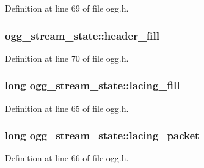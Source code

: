 Definition at line 69 of file ogg.\+h.

\subsubsection[{\texorpdfstring{header\+\_\+fill}{header_fill}}]{ ogg\+\_\+stream\+\_\+state\+::header\+\_\+fill}\hypertarget{structogg__stream__state_af37e7ffba5e7197c8bfabee7a1a6b641}{}\label{structogg__stream__state_af37e7ffba5e7197c8bfabee7a1a6b641}


Definition at line 70 of file ogg.\+h.

\subsubsection[{\texorpdfstring{lacing\+\_\+fill}{lacing_fill}}]{\setlength{\rightskip}{0pt plus 5cm}long ogg\+\_\+stream\+\_\+state\+::lacing\+\_\+fill}\hypertarget{structogg__stream__state_a6090ad58db768aa90218b0bc421d6f0e}{}\label{structogg__stream__state_a6090ad58db768aa90218b0bc421d6f0e}


Definition at line 65 of file ogg.\+h.

\subsubsection[{\texorpdfstring{lacing\+\_\+packet}{lacing_packet}}]{\setlength{\rightskip}{0pt plus 5cm}long ogg\+\_\+stream\+\_\+state\+::lacing\+\_\+packet}\hypertarget{structogg__stream__state_add3aba822d7f0e2e23c1927a20aaa683}{}\label{structogg__stream__state_add3aba822d7f0e2e23c1927a20aaa683}


Definition at line 66 of file ogg.\+h.

